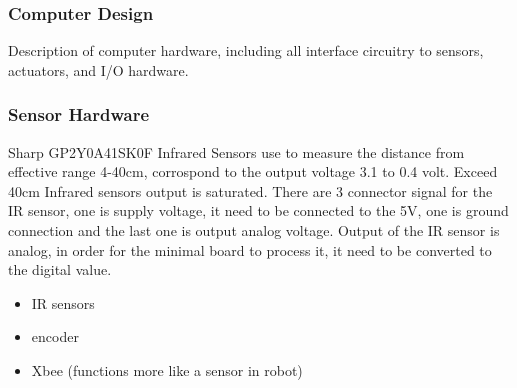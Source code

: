 \documentclass[11pt,a4paper]{article}
\begin{document}
    \subsubsection{Computer Design}
    Description of computer hardware, including all interface circuitry to sensors, actuators, and I/O hardware.
    \subsubsection{Sensor Hardware}
      Sharp GP2Y0A41SK0F Infrared Sensors use to measure the distance from effective range 4-40cm, corrospond to the        output voltage 3.1 to 0.4 volt. Exceed 40cm Infrared sensors output is saturated. There are 3 connector signal        for the IR sensor, one is supply voltage, it need to be connected to the 5V, one is ground connection and the         last one is output analog voltage.  Output of the IR sensor is analog, in order for the minimal board to              process it, it need to be converted to the digital value.
      \begin{itemize}
        \item IR sensors
        \item encoder
        \item Xbee (functions more like a sensor in robot)
      \end{itemize}
\end{document}
